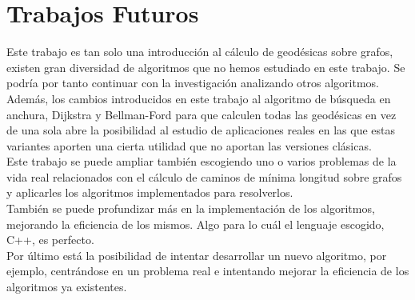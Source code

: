 \section{Trabajos Futuros}

Este trabajo es tan solo una introducción al cálculo de geodésicas sobre grafos, existen gran diversidad de algoritmos que no hemos estudiado en este trabajo. Se podría por tanto continuar con la investigación analizando otros algoritmos. \\

Además, los cambios introducidos en este trabajo al algoritmo de búsqueda en anchura, Dijkstra y Bellman-Ford para que calculen todas las geodésicas en vez de una sola abre la posibilidad al estudio de aplicaciones reales en las que estas variantes aporten una cierta utilidad que no aportan las versiones clásicas. \\

Este trabajo se puede ampliar también escogiendo uno o varios problemas de la vida real relacionados con el cálculo de caminos de mínima longitud sobre grafos y aplicarles los algoritmos implementados para resolverlos. \\

También se puede profundizar más en la implementación de los algoritmos, mejorando la eficiencia de los mismos. Algo para lo cuál el lenguaje escogido, C++, es perfecto. \\

Por último está la posibilidad de intentar desarrollar un nuevo algoritmo, por ejemplo, centrándose en un problema real e intentando mejorar la eficiencia de los algoritmos ya existentes.

\endinput




